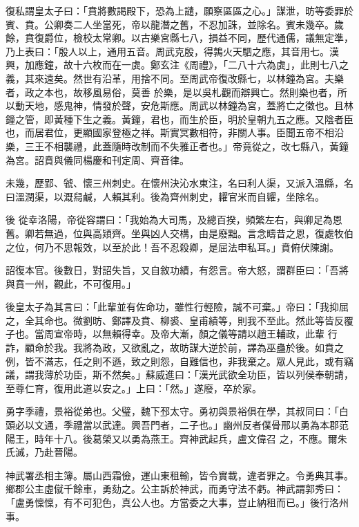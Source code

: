 \begin{pinyinscope}
 復私謂皇太子曰：「賁將數謁殿下，恐為上譴，願察區區之心。」謀泄，昉等委罪於賓、賁。公卿奏二人坐當死，帝以龍潛之舊，不忍加誅，並除名。賓未幾卒。歲餘，賁復爵位，檢校太常卿。以古樂宮縣七八，損益不同，歷代通儒，議無定準，乃上表曰：「殷人以上，通用五音。周武克殷，得鶉火天駟之應，其音用七。漢興，加應鐘，故十六枚而在一虡。鄭玄注《周禮》，「二八十六為虡」，此則七八之義，其來遠矣。然世有沿革，用捨不同。至周武帝復改縣七，以林鐘為宮。夫樂者，政之本也，故移風易俗，莫善
 於樂，是以吳札觀而辯興亡。然則樂也者，所以動天地，感鬼神，情發於聲，安危斯應。周武以林鐘為宮，蓋將亡之徵也。且林鐘之管，即黃種下生之義。黃鐘，君也，而生於臣，明於皇朝九五之應。又陰者臣也，而居君位，更顯國家登極之祥。斯實冥數相符，非關人事。臣聞五帝不相沿樂，三王不相襲禮，此蓋隨時改制而不失雅正者也。」帝竟從之，改七縣八，黃鐘為宮。詔賁與儀同楊慶和刊定周、齊音律。



 未幾，歷郢、虢、懷三州刺史。在懷州決沁水東注，名曰利人渠，又派入溫縣，名曰溫潤渠，以溉舄鹹，人賴其利。後為齊州刺史，糶官米而自糶，坐除名。



 後
 從幸洛陽，帝從容謂曰：「我始為大司馬，及總百揆，頻繁左右，與卿足為恩舊。卿若無過，位與高熲齊。坐與凶人交構，由是廢黜。言念疇昔之恩，復處牧伯之位，何乃不思報效，以至於此！吾不忍殺卿，是屈法申私耳。」賁俯伏陳謝。



 詔復本官。後數日，對詔失旨，又自敘功績，有怨言。帝大怒，謂群臣曰：「吾將與賁一州，觀此，不可復用。」



 後皇太子為其言曰：「此輩並有佐命功，雖性行輕險，誠不可棄。」帝曰：「我抑屈之，全其命也。微劉昉、鄭譯及賁、柳裘、皇甫績等，則我不至此。然此等皆反覆子也。當周宣帝時，以無賴得幸。及帝大漸，顏之儀等請以趙王輔政，此輩
 行詐，顧命於我。我將為政，又欲亂之，故昉謀大逆於前，譯為巫蠱於後。如賁之例，皆不滿志，任之則不遜，致之則怨，自難信也，非我棄之。眾人見此，或有竊議，謂我薄於功臣，斯不然矣。」蘇威進曰：「漢光武欲全功臣，皆以列侯奉朝請，至尊仁育，復用此道以安之。」上曰：「然。」遂廢，卒於家。



 勇字季禮，景裕從弟也。父璧，魏下邳太守。勇初與景裕俱在學，其叔同曰：「白頭必以文通，季禮當以武達。興吾門者，二子也。」幽州反者僕骨邢以勇為本郡范陽王，時年十八。後葛榮又以勇為燕王。齊神武起兵，盧文偉召
 之，不應。爾朱氏滅，乃赴晉陽。



 神武署丞相主簿。屬山西霜儉，運山東租輸，皆令實載，違者罪之。令勇典其事。鄉郡公主虛僦千餘車，勇劾之。公主訴於神武，而勇守法不虧。神武謂郭秀曰：「盧勇懍懍，有不可犯色，真公人也。方當委之大事，豈止納租而已。」後行洛州事。




\end{pinyinscope}
